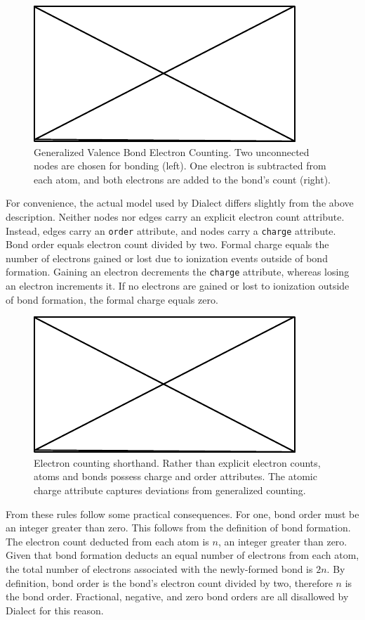 \documentclass{article}
\def\ttt{\texttt}
\begin{document}
\begin{figure}
    \centering
    \includegraphics{filler}
    \caption{Generalized Valence Bond Electron Counting. Two unconnected nodes are chosen for bonding (left). One electron is subtracted from each atom, and both electrons are added to the bond's count (right).}
    \label{fig:electron-counting}
\end{figure}

For convenience, the actual model used by Dialect differs slightly from the above description. Neither nodes nor edges carry an explicit electron count attribute. Instead, edges carry an \ttt{order} attribute, and nodes carry a \ttt{charge} attribute. Bond order equals electron count divided by two. Formal charge equals the number of electrons gained or lost due to ionization events outside of bond formation. Gaining an electron decrements the \ttt{charge} attribute, whereas losing an electron increments it. If no electrons are gained or lost to ionization outside of bond formation, the formal charge equals zero. 

\begin{figure}
    \centering
    \includegraphics{filler}
    \caption{Electron counting shorthand. Rather than explicit electron counts, atoms and bonds possess charge and order attributes. The atomic charge attribute captures deviations from generalized counting.}
    \label{fig:electron-counting-shorthand}
\end{figure}

From these rules follow some practical consequences. For one, bond order must be an integer greater than zero. This follows from the definition of bond formation. The electron count deducted from each atom is $n$, an integer greater than zero. Given that bond formation deducts an equal number of electrons from each atom, the total number of electrons associated with the newly-formed bond is $2n$. By definition, bond order is the bond's electron count divided by two, therefore $n$ is the bond order. Fractional, negative, and zero bond orders are all disallowed by Dialect for this reason.
\end{document}
